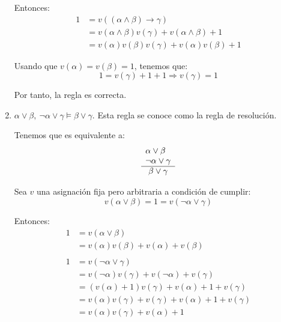 \begin{ejercicio*}
\begin{enumerate}
        Entonces:
        \begin{align*}
            1 &= v((\alpha\land\beta)\rightarrow\gamma) \\
            &= v(\alpha\land\beta)v(\gamma)+v(\alpha\land\beta)+1\\
            &= v(\alpha)v(\beta)v(\gamma)+v(\alpha)v(\beta)+1
        \end{align*}

        Usando que $v(\alpha)=v(\beta)=1$, tenemos que:
        \begin{equation*}
            1 = v(\gamma)+1+1 \Longrightarrow v(\gamma)=1
        \end{equation*}

        Por tanto, la regla es correcta.

        \item $\alpha\lor\beta,~\lnot\alpha\lor \gamma\vDash \beta\lor\gamma$. Esta regla se conoce como la regla de resolución.

        Tenemos que es equivalente a:
        \begin{equation*}
            \begin{array}{l}
                \alpha\lor\beta\\
                \lnot\alpha\lor\gamma\\ \hline
                \multicolumn{1}{c}{\beta\lor\gamma}
            \end{array}
        \end{equation*}

        Sea $v$ una asignación fija pero arbitraria a condición de cumplir:
        \begin{equation*}
            v(\alpha\lor\beta)=1=v(\lnot\alpha\lor\gamma)
        \end{equation*}

        Entonces:
        \begin{align*}
            1 &= v(\alpha\lor\beta) \\
            &= v(\alpha)v(\beta)+v(\alpha)+v(\beta)\\ \\
            1 &= v(\lnot\alpha\lor\gamma) \\
            &= v(\lnot \alpha)v(\gamma)+v(\lnot \alpha)+v(\gamma)\\
            &= (v(\alpha)+1)v(\gamma)+v(\alpha)+1+v(\gamma)\\
            &= v(\alpha)v(\gamma)+v(\gamma)+v(\alpha)+1+v(\gamma)\\
            &= v(\alpha)v(\gamma)+v(\alpha)+1
        \end{align*}


\end{enumerate}
\end{ejercicio*}
